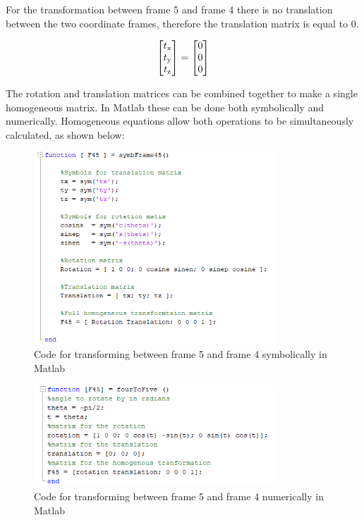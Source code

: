 \documentclass [11pt]{report}
\begin{document}
For the transformation between frame 5 and frame 4 there is no translation between the two coordinate frames, therefore the translation matrix is equal to 0. 

\begin{equation*}
\begin{bmatrix}
t\textsubscript{x}\\
t\textsubscript{y}\\
t\textsubscript{z}\\
\end{bmatrix}
=
\begin{bmatrix}
0\\
0\\
0\\
\end{bmatrix}
\end{equation*}

The rotation and translation matrices can be combined together to make a single homogeneous matrix. In Matlab these can be done both symbolically and numerically. Homogeneous equations allow both operations to be simultaneously calculated, as shown below:

\begin{figure}[H]
\centerline{\includegraphics[width=9cm]{symbFrame45.png}}
\caption{Code for transforming between frame 5 and frame 4 symbolically in Matlab}
\label{fig}
\end{figure}


\begin{figure}[H]
\centerline{\includegraphics[width=9cm]{fourToFivecode.png}}
\caption{Code for transforming between frame 5 and frame 4 numerically in Matlab}
\label{fig}
\end{figure}
\end{document}
